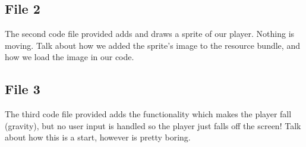 \documentclass[12pt]{article}
\begin{document}
\subsection*{File 2}
The second code file provided adds and draws a sprite of our player. Nothing is moving.
Talk about how we added the sprite's image to the resource bundle, and how we load the image in our code.

\newpage

\subsection*{File 3}
The third code file provided adds the functionality which makes the player fall (gravity), but no user input is handled so the player just falls off the screen!
Talk about how this is a start, however is pretty boring.
\end{document}
